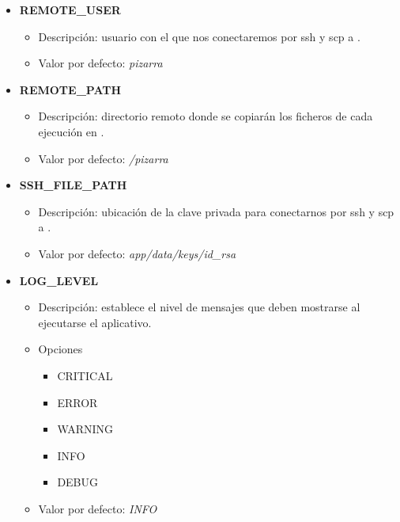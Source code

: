 \documentclass[11pt,spanish,listoffigures,listoftables]{tfgetsinf}
\begin{document}
\begin{itemize}
	\item \textbf{REMOTE\_USER}
	\begin{itemize}
		\item Descripción: usuario con el que nos conectaremos por \acrshort{ssh} y \acrshort{scp} a \kahan.
		\item Valor por defecto: \textit{pizarra}
	\end{itemize}
\end{itemize}

\begin{itemize}
	\item \textbf{REMOTE\_PATH}
	\begin{itemize}
		\item Descripción: directorio remoto donde se copiarán los ficheros de cada ejecución en \kahan.
		\item Valor por defecto: \textit{/pizarra}
	\end{itemize}
\end{itemize}

\begin{itemize}
	\item \textbf{SSH\_FILE\_PATH}
	\begin{itemize}
		\item Descripción: ubicación de la clave privada para conectarnos por \acrshort{ssh} y \acrshort{scp} a \kahan.
		\item Valor por defecto: \textit{app/data/keys/id\_rsa}
	\end{itemize}
\end{itemize}

\begin{itemize}
	\item \textbf{LOG\_LEVEL}
	\begin{itemize}
		\item Descripción: establece el nivel de mensajes que deben mostrarse al ejecutarse el aplicativo.
		\item Opciones
		\begin{itemize}
			\item CRITICAL
			\item ERROR
			\item WARNING
			\item INFO
			\item DEBUG
		\end{itemize}
		\item Valor por defecto: \textit{INFO}
	\end{itemize}
\end{itemize}
\end{document}
